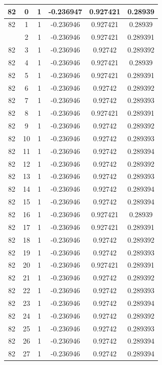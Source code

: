 \documentclass[12pt,a4paper]{article}
\numberwithin{equation}{section}
\numberwithin{figure}{section}
\numberwithin{table}{section}
\begin{document}
\begin{longtable}{|c|c|c|c|c|c|}
82 & 0 & 1 & -0.236947 & 0.927421 & 0.28939 \\ \hline
82 & 1 & 1 & -0.236946 & 0.927421 & 0.28939 \\ \hline
\pagebreak
82 & 2 & 1 & -0.236946 & 0.927421 & 0.289391 \\ \hline
82 & 3 & 1 & -0.236946 & 0.92742 & 0.289392 \\ \hline
82 & 4 & 1 & -0.236946 & 0.927421 & 0.28939 \\ \hline
82 & 5 & 1 & -0.236946 & 0.927421 & 0.289391 \\ \hline
82 & 6 & 1 & -0.236946 & 0.92742 & 0.289392 \\ \hline
82 & 7 & 1 & -0.236946 & 0.92742 & 0.289393 \\ \hline
82 & 8 & 1 & -0.236946 & 0.927421 & 0.289391 \\ \hline
82 & 9 & 1 & -0.236946 & 0.92742 & 0.289392 \\ \hline
82 & 10 & 1 & -0.236946 & 0.92742 & 0.289393 \\ \hline
82 & 11 & 1 & -0.236946 & 0.92742 & 0.289394 \\ \hline
82 & 12 & 1 & -0.236946 & 0.92742 & 0.289392 \\ \hline
82 & 13 & 1 & -0.236946 & 0.92742 & 0.289393 \\ \hline
82 & 14 & 1 & -0.236946 & 0.92742 & 0.289394 \\ \hline
82 & 15 & 1 & -0.236946 & 0.92742 & 0.289394 \\ \hline
82 & 16 & 1 & -0.236946 & 0.927421 & 0.28939 \\ \hline
82 & 17 & 1 & -0.236946 & 0.927421 & 0.289391 \\ \hline
82 & 18 & 1 & -0.236946 & 0.92742 & 0.289392 \\ \hline
82 & 19 & 1 & -0.236946 & 0.92742 & 0.289393 \\ \hline
82 & 20 & 1 & -0.236946 & 0.927421 & 0.289391 \\ \hline
82 & 21 & 1 & -0.236946 & 0.92742 & 0.289392 \\ \hline
82 & 22 & 1 & -0.236946 & 0.92742 & 0.289393 \\ \hline
82 & 23 & 1 & -0.236946 & 0.92742 & 0.289394 \\ \hline
82 & 24 & 1 & -0.236946 & 0.92742 & 0.289392 \\ \hline
82 & 25 & 1 & -0.236946 & 0.92742 & 0.289393 \\ \hline
82 & 26 & 1 & -0.236946 & 0.92742 & 0.289394 \\ \hline
82 & 27 & 1 & -0.236946 & 0.92742 & 0.289394 \\ \hline

\end{longtable}
\end{document}
